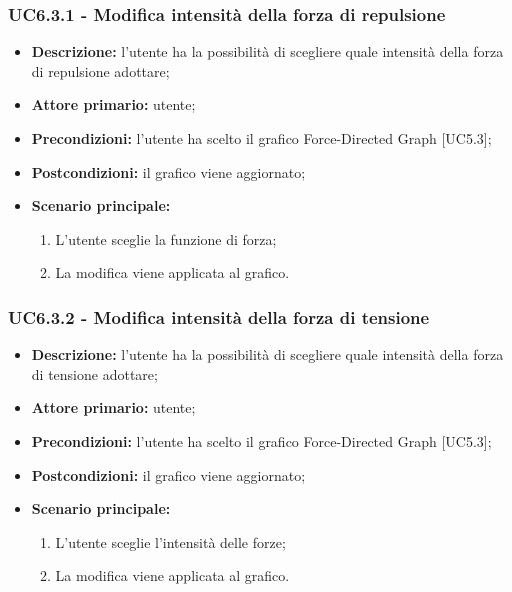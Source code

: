   \subsubsection{UC6.3.1 - Modifica intensità della forza di repulsione}
  \begin{itemize}
    \item \textbf{Descrizione:} l'utente ha la possibilità di scegliere quale intensità della forza di repulsione adottare;
    \item \textbf{Attore primario:} utente;
    \item \textbf{Precondizioni:} l’utente ha scelto il grafico Force-Directed Graph [UC5.3];
    \item \textbf{Postcondizioni:} il grafico viene aggiornato;
    \item \textbf{Scenario principale:}
     \begin{enumerate}
      \item L'utente sceglie la funzione di forza;
      \item La modifica viene applicata al grafico.
    \end{enumerate}
  \end{itemize}

  \subsubsection{UC6.3.2 - Modifica intensità della forza di tensione}
  \begin{itemize}
    \item \textbf{Descrizione:} l'utente ha la possibilità di scegliere quale intensità della forza di tensione adottare;
    \item \textbf{Attore primario:} utente;
    \item \textbf{Precondizioni:} l’utente ha scelto il grafico Force-Directed Graph [UC5.3];
    \item \textbf{Postcondizioni:} il grafico viene aggiornato;
    \item \textbf{Scenario principale:}
      \begin{enumerate}
      \item L'utente sceglie l'intensità delle forze;
      \item La modifica viene applicata al grafico.
    \end{enumerate}
  \end{itemize}

